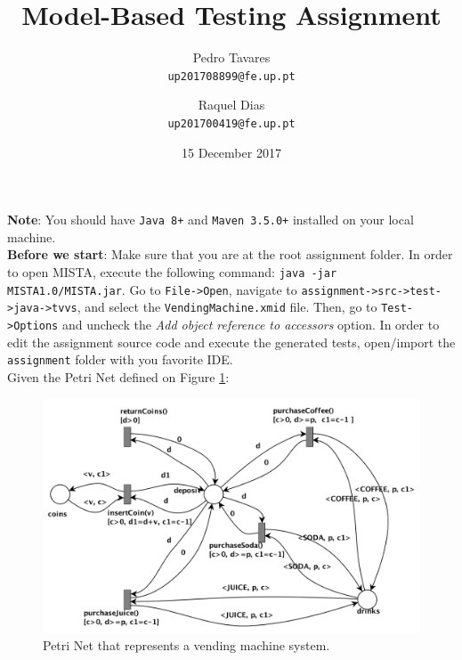 \documentclass[11pt]{article}
\date{15 December 2017}
\begin{document}
\author{Pedro Tavares \\ \texttt{up201708899@fe.up.pt} \and Raquel Dias \\ \texttt{up201700419@fe.up.pt} }
\title{Model-Based Testing Assignment}

\maketitle

\textbf{Note}: You should have \texttt{Java 8+} and \texttt{Maven 3.5.0+} installed on your local machine. \\

\textbf{Before we start}: Make sure that you are at the root assignment folder.
In order to open MISTA, execute the following command: \texttt{java -jar MISTA1.0/MISTA.jar}. Go to \texttt{File->Open}, navigate to \texttt{assignment->src->test->java->tvvs}, and select the \texttt{VendingMachine.xmid} file. Then, go to \texttt{Test->Options} and uncheck the \textit{Add object reference to accessors} option. In order to edit the assignment source code and execute the generated tests, open/import the \texttt{assignment} folder with you favorite IDE.\\

Given the Petri Net defined on Figure \ref{fig:petri-net}:

\begin{figure}[!htb]
    \centering
    \includegraphics[scale=0.65]{petri-net.png}
    \caption{Petri Net that represents a vending machine system.}
    \label{fig:petri-net}
\end{figure}
\end{document}
